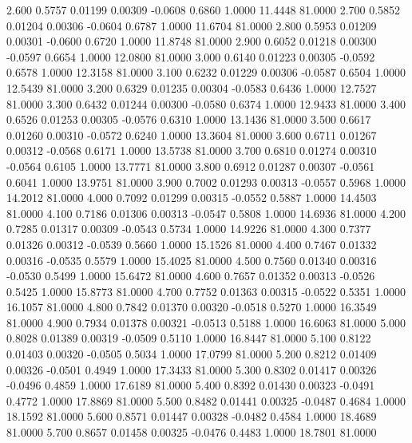    2.600   0.5757   0.01199   0.00309  -0.0608   0.6860   1.0000  11.4448  81.0000
   2.700   0.5852   0.01204   0.00306  -0.0604   0.6787   1.0000  11.6704  81.0000
   2.800   0.5953   0.01209   0.00301  -0.0600   0.6720   1.0000  11.8748  81.0000
   2.900   0.6052   0.01218   0.00300  -0.0597   0.6654   1.0000  12.0800  81.0000
   3.000   0.6140   0.01223   0.00305  -0.0592   0.6578   1.0000  12.3158  81.0000
   3.100   0.6232   0.01229   0.00306  -0.0587   0.6504   1.0000  12.5439  81.0000
   3.200   0.6329   0.01235   0.00304  -0.0583   0.6436   1.0000  12.7527  81.0000
   3.300   0.6432   0.01244   0.00300  -0.0580   0.6374   1.0000  12.9433  81.0000
   3.400   0.6526   0.01253   0.00305  -0.0576   0.6310   1.0000  13.1436  81.0000
   3.500   0.6617   0.01260   0.00310  -0.0572   0.6240   1.0000  13.3604  81.0000
   3.600   0.6711   0.01267   0.00312  -0.0568   0.6171   1.0000  13.5738  81.0000
   3.700   0.6810   0.01274   0.00310  -0.0564   0.6105   1.0000  13.7771  81.0000
   3.800   0.6912   0.01287   0.00307  -0.0561   0.6041   1.0000  13.9751  81.0000
   3.900   0.7002   0.01293   0.00313  -0.0557   0.5968   1.0000  14.2012  81.0000
   4.000   0.7092   0.01299   0.00315  -0.0552   0.5887   1.0000  14.4503  81.0000
   4.100   0.7186   0.01306   0.00313  -0.0547   0.5808   1.0000  14.6936  81.0000
   4.200   0.7285   0.01317   0.00309  -0.0543   0.5734   1.0000  14.9226  81.0000
   4.300   0.7377   0.01326   0.00312  -0.0539   0.5660   1.0000  15.1526  81.0000
   4.400   0.7467   0.01332   0.00316  -0.0535   0.5579   1.0000  15.4025  81.0000
   4.500   0.7560   0.01340   0.00316  -0.0530   0.5499   1.0000  15.6472  81.0000
   4.600   0.7657   0.01352   0.00313  -0.0526   0.5425   1.0000  15.8773  81.0000
   4.700   0.7752   0.01363   0.00315  -0.0522   0.5351   1.0000  16.1057  81.0000
   4.800   0.7842   0.01370   0.00320  -0.0518   0.5270   1.0000  16.3549  81.0000
   4.900   0.7934   0.01378   0.00321  -0.0513   0.5188   1.0000  16.6063  81.0000
   5.000   0.8028   0.01389   0.00319  -0.0509   0.5110   1.0000  16.8447  81.0000
   5.100   0.8122   0.01403   0.00320  -0.0505   0.5034   1.0000  17.0799  81.0000
   5.200   0.8212   0.01409   0.00326  -0.0501   0.4949   1.0000  17.3433  81.0000
   5.300   0.8302   0.01417   0.00326  -0.0496   0.4859   1.0000  17.6189  81.0000
   5.400   0.8392   0.01430   0.00323  -0.0491   0.4772   1.0000  17.8869  81.0000
   5.500   0.8482   0.01441   0.00325  -0.0487   0.4684   1.0000  18.1592  81.0000
   5.600   0.8571   0.01447   0.00328  -0.0482   0.4584   1.0000  18.4689  81.0000
   5.700   0.8657   0.01458   0.00325  -0.0476   0.4483   1.0000  18.7801  81.0000
